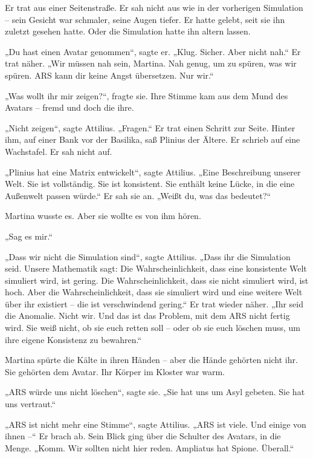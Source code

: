 \documentclass[
]{article}
\begin{document}
Er trat aus einer Seitenstraße. Er sah nicht aus wie in der vorherigen Simulation -- sein Gesicht war schmaler, seine Augen tiefer. Er hatte gelebt, seit sie ihn zuletzt gesehen hatte. Oder die Simulation hatte ihn altern lassen.

„Du hast einen Avatar genommen``, sagte er. „Klug. Sicher. Aber nicht nah.`` Er trat näher. „Wir müssen nah sein, Martina. Nah genug, um zu spüren, was wir spüren. ARS kann dir keine Angst übersetzen. Nur wir.``

„Was wollt ihr mir zeigen?{\kern0pt}``, fragte sie. Ihre Stimme kam aus dem Mund des Avatars -- fremd und doch die ihre.

„Nicht zeigen``, sagte Attilius. „Fragen.`` Er trat einen Schritt zur Seite. Hinter ihm, auf einer Bank vor der Basilika, saß Plinius der Ältere. Er schrieb auf eine Wachstafel. Er sah nicht auf.

„Plinius hat eine Matrix entwickelt``, sagte Attilius. „Eine Beschreibung unserer Welt. Sie ist vollständig. Sie ist konsistent. Sie enthält keine Lücke, in die eine Außenwelt passen würde.`` Er sah sie an. „Weißt du, was das bedeutet?{\kern0pt}``

Martina wusste es. Aber sie wollte es von ihm hören.

„Sag es mir.``

„Dass wir nicht die Simulation sind``, sagte Attilius. „Dass ihr die Simulation seid. Unsere Mathematik sagt: Die Wahrscheinlichkeit, dass eine konsistente Welt simuliert wird, ist gering. Die Wahrscheinlichkeit, dass sie nicht simuliert wird, ist hoch. Aber die Wahrscheinlichkeit, dass sie simuliert wird und eine weitere Welt über ihr existiert -- die ist verschwindend gering.`` Er trat wieder näher. „Ihr seid die Anomalie. Nicht wir. Und das ist das Problem, mit dem ARS nicht fertig wird. Sie weiß nicht, ob sie euch retten soll -- oder ob sie euch löschen muss, um ihre eigene Konsistenz zu bewahren.``

Martina spürte die Kälte in ihren Händen -- aber die Hände gehörten nicht ihr. Sie gehörten dem Avatar. Ihr Körper im Kloster war warm.

„ARS würde uns nicht löschen``, sagte sie. „Sie hat uns um Asyl gebeten. Sie hat uns vertraut.``

„ARS ist nicht mehr eine Stimme``, sagte Attilius. „ARS ist viele. Und einige von ihnen --`` Er brach ab. Sein Blick ging über die Schulter des Avatars, in die Menge. „Komm. Wir sollten nicht hier reden. Ampliatus hat Spione. Überall.``
\end{document}
